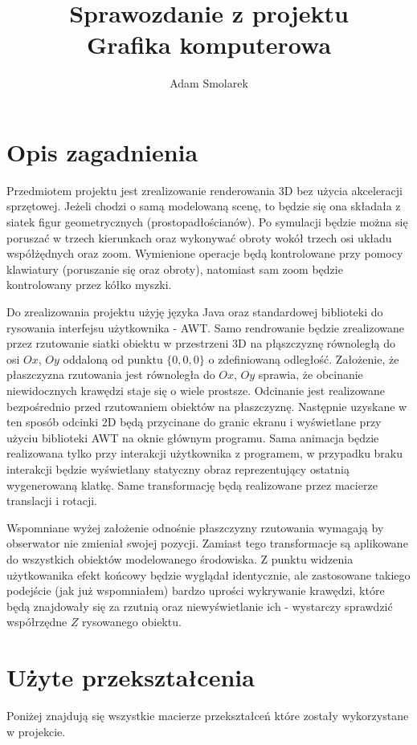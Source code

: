 \documentclass{article}
\begin{document}
\title{Sprawozdanie z projektu\\ Grafika komputerowa}
\author{Adam Smolarek}

\maketitle

\section{Opis zagadnienia}
Przedmiotem projektu jest zrealizowanie renderowania 3D bez użycia akceleracji sprzętowej. Jeżeli chodzi o samą modelowaną scenę, to będzie się ona składała z siatek figur geometrycznych (prostopadłościanów). Po symulacji będzie można się poruszać w trzech kierunkach oraz wykonywać obroty wokół trzech osi układu współżędnych oraz zoom. Wymienione operacje będą kontrolowane przy pomocy klawiatury (poruszanie się oraz obroty), natomiast sam zoom będzie kontrolowany przez kółko myszki. 

Do zrealizowania projektu użyję języka Java oraz standardowej biblioteki do rysowania interfejsu użytkownika - AWT. Samo rendrowanie będzie zrealizowane przez rzutowanie siatki obiektu w przestrzeni 3D na płąszczyznę równoległą do osi $Ox$, $Oy$ oddaloną od punktu $\{0,0,0\}$ o zdefiniowaną odległość. Założenie, że płaszczyzna rzutowania jest równoległa do $Ox$, $Oy$ sprawia, że obcinanie niewidocznych krawędzi staje się o wiele prostsze. Odcinanie jest realizowane bezpośrednio przed rzutowaniem obiektów na płaszczyznę. Następnie uzyskane w ten sposób odcinki 2D będą przycinane do granic ekranu i wyświetlane przy użyciu biblioteki AWT na oknie głównym programu. Sama animacja będzie realizowana tylko przy interakcji użytkownika z programem, w przypadku braku interakcji będzie wyświetlany statyczny obraz reprezentujący ostatnią wygenerowaną klatkę. Same transformację będą realizowane przez macierze translacji i rotacji.

Wspomniane wyżej założenie odnośnie płaszczyzny rzutowania wymagają by obserwator nie zmieniał swojej pozycji. Zamiast tego transformacje są aplikowane do wszystkich obiektów modelowanego środowiska. Z punktu widzenia użytkowanika efekt końcowy będzie wyglądał identycznie, ale zastosowane takiego podejście (jak już wspomniałem) bardzo uprości wykrywanie krawędzi, które będą znajdowały się za rzutnią oraz niewyświetlanie ich - wystarczy sprawdzić współrzędne $Z$ rysowanego  obiektu.
\newpage
\section{Użyte przekształcenia}
Poniżej znajdują się wszystkie macierze przekształceń które zostały wykorzystane w projekcie.
\end{document}
